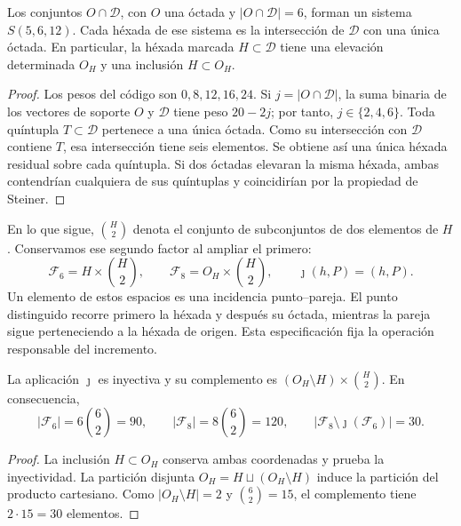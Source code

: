 \begin{proposition}
\label{rev4:ae:elevacion}
Los conjuntos \(O\cap\mathscr D\), con \(O\) una óctada y
\(|O\cap\mathscr D|=6\), forman un sistema \(S(5,6,12)\).
Cada héxada de ese sistema es la intersección de \(\mathscr D\) con
una única óctada. En particular, la héxada marcada \(H\subset\mathscr D\)
tiene una elevación determinada \(O_H\) y una inclusión \(H\subset O_H\).
\end{proposition}
\begin{proof}
Los pesos del código son \(0,8,12,16,24\). Si
\(j=|O\cap\mathscr D|\), la suma binaria de los vectores de soporte
\(O\) y \(\mathscr D\) tiene peso \(20-2j\); por tanto,
\(j\in\{2,4,6\}\). Toda quíntupla \(T\subset\mathscr D\)
pertenece a una única óctada. Como su intersección con \(\mathscr D\)
contiene \(T\), esa intersección tiene seis elementos. Se obtiene así
una única héxada residual sobre cada quíntupla. Si dos óctadas elevaran
la misma héxada, ambas contendrían cualquiera de sus quíntuplas y
coincidirían por la propiedad de Steiner.
\end{proof}

En lo que sigue, \(\binom H2\) denota el conjunto de subconjuntos de dos
elementos de \(H\). Conservamos ese segundo factor al ampliar el primero:
\begin{equation}
 \mathcal F_6=H\times\binom H2,
 \qquad
 \mathcal F_8=O_H\times\binom H2,
 \qquad
 \jmath(h,P)=(h,P).
 \label{rev4:ae:incidencias}
\end{equation}
Un elemento de estos espacios es una incidencia punto--pareja. El punto
distinguido recorre primero la héxada y después su óctada, mientras la
pareja sigue perteneciendo a la héxada de origen. Esta especificación
fija la operación responsable del incremento.

\begin{proposition}
\label{rev4:ae:incremento}
La aplicación \(\jmath\) es inyectiva y su complemento es
\((O_H\setminus H)\times\binom H2\). En consecuencia,
\begin{equation}
 |\mathcal F_6|=6\binom62=90,
 \qquad |\mathcal F_8|=8\binom62=120,
 \qquad |\mathcal F_8\setminus\jmath(\mathcal F_6)|=30.
 \label{rev4:ae:cardinales}
\end{equation}
\end{proposition}
\begin{proof}
La inclusión \(H\subset O_H\) conserva ambas coordenadas y prueba la
inyectividad. La partición disjunta \(O_H=H\sqcup(O_H\setminus H)\)
induce la partición del producto cartesiano. Como
\(|O_H\setminus H|=2\) y \(\binom62=15\), el complemento tiene
\(2\cdot15=30\) elementos.
\end{proof}

